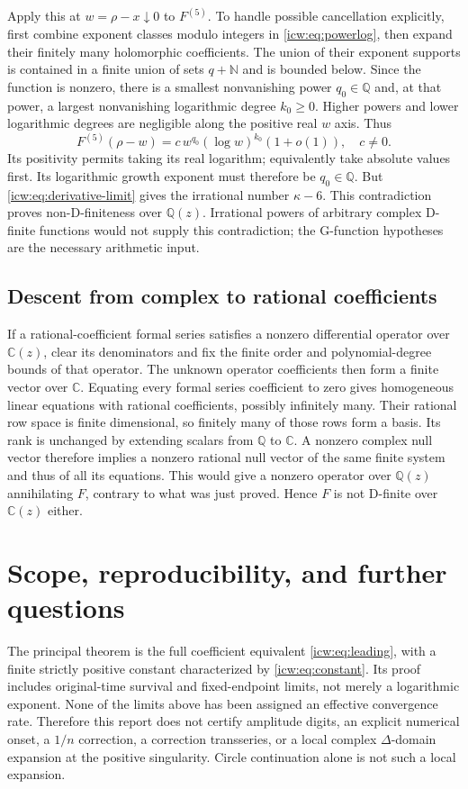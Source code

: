 \documentclass[11pt,letterpaper]{article}
\theoremstyle{remark}\newtheorem{remark}[theorem]{Remark}
\newcommand{\NN}{\mathbb N}
\newcommand{\QQ}{\mathbb Q}
\newcommand{\CC}{\mathbb C}
\newcommand{\1}{\mathbf1}
\begin{document}
Apply this at $w=\rho-x\downarrow0$ to $F^{(5)}$. To handle possible
cancellation explicitly, first combine exponent classes modulo integers
in \eqref{icw:eq:powerlog}, then expand their finitely many holomorphic
coefficients. The union of their exponent supports is contained in a
finite union of sets $q+\NN$ and is bounded below. Since the function
is nonzero, there is a smallest nonvanishing power $q_0\in\QQ$ and,
at that power, a largest nonvanishing logarithmic degree $k_0\ge0$.
Higher powers and lower logarithmic degrees are negligible along the
positive real $w$ axis. Thus
\[
 F^{(5)}(\rho-w)=c\,w^{q_0}(\log w)^{k_0}(1+o(1)),\quad c\ne0.
\]
Its positivity permits taking its real logarithm; equivalently take
absolute values first. Its logarithmic growth exponent must therefore
be $q_0\in\QQ$. But \eqref{icw:eq:derivative-limit} gives the irrational
number $\kappa-6$. This contradiction proves non-D-finiteness over
$\QQ(z)$. Irrational powers of arbitrary complex D-finite functions
would not supply this contradiction; the G-function hypotheses are the
necessary arithmetic input.

\subsection{Descent from complex to rational coefficients}
If a rational-coefficient formal series satisfies a nonzero differential
operator over $\CC(z)$, clear its denominators and fix the finite order
and polynomial-degree bounds of that operator. The unknown operator
coefficients then form a finite vector over $\CC$. Equating every formal
series coefficient to zero gives homogeneous linear equations with
rational coefficients, possibly infinitely many. Their rational row
space is finite dimensional, so finitely many of those rows form a
basis. Its rank is unchanged by extending scalars from $\QQ$ to $\CC$.
A nonzero complex null vector therefore implies a nonzero rational null
vector of the same finite system and thus of all its equations. This
would give a nonzero operator over $\QQ(z)$ annihilating $F$, contrary
to what was just proved. Hence $F$ is not D-finite over $\CC(z)$ either.


\section{Scope, reproducibility, and further questions}\label{icw:sec:scope}
The principal theorem is the full coefficient equivalent
\eqref{icw:eq:leading}, with a finite strictly positive constant characterized
by \eqref{icw:eq:constant}. Its proof includes original-time survival and
fixed-endpoint limits, not merely a logarithmic exponent. None of the
limits above has been assigned an effective convergence rate. Therefore
this report does not certify amplitude digits, an explicit numerical
onset, a $1/n$ correction, a correction transseries, or a local complex
$\Delta$-domain expansion at the positive singularity. Circle
continuation alone is not such a local expansion.
\end{document}
